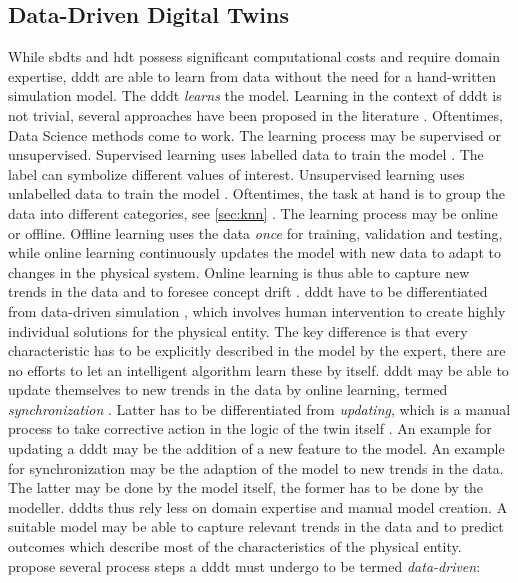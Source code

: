 \subsection*{Data-Driven Digital Twins}
\label{sec:data-driven-digital-twins}

While \gls{sbdt}s and \gls{hdt} possess significant computational costs and require domain expertise, \gls{dddt} are able to learn from data without the need for a hand-written simulation model. The \gls{dddt} \textit{learns} the model. Learning in the context of \gls{dddt} is not trivial, several approaches have been proposed in the literature \autocite{he2019data,Friederich2022,francis2021towards}. Oftentimes, Data Science methods come to work. The learning process may be supervised or unsupervised. Supervised learning uses labelled data to train the model \autocite{cunningham2008supervised}. The label can symbolize different values of interest. Unsupervised learning uses unlabelled data to train the model \autocite{barlow1989unsupervised}. Oftentimes, the task at hand is to group the data into different categories, see \autoref{sec:knn} \autocite{Biesinger2019}.
The learning process may be online or offline. Offline learning uses the data \textit{once} for training, validation and testing, while online learning continuously updates the model with new data to adapt to changes in the physical system. Online learning is thus able to capture new trends in the data and to foresee concept drift \autocite{tsymbal2004problem}. \gls{dddt} have to be differentiated from data-driven simulation \autocite{Charpentier2014}, which involves human intervention to create highly individual solutions for the physical entity. The key difference is that every characteristic has to be explicitly described in the model by the expert, there are no efforts to let an intelligent algorithm learn these by itself. \gls{dddt} may be able to update themselves to new trends in the data by online learning, termed \textit{synchronization} \autocite{reinhardt2019survey}. Latter has to be differentiated from \textit{updating}, which is a manual process to take corrective action in the logic of the twin itself \autocite{Schwede2024}. An example for updating a \gls{dddt} may be the addition of a new feature to the model. An example for synchronization may be the adaption of the model to new trends in the data. The latter may be done by the model itself, the former has to be done by the modeller.
\gls{dddt}s thus rely less on domain expertise and manual model creation. A suitable model may be able to capture relevant trends in the data and to predict outcomes which describe most of the characteristics of the physical entity. \textcite{francis2021towards} propose several process steps a \gls{dddt} must undergo to be termed \textit{data-driven}:

